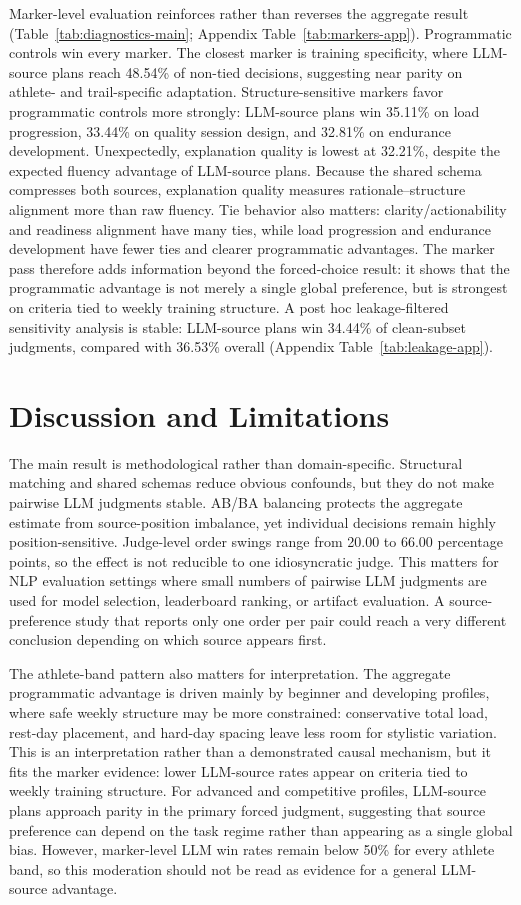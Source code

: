 \documentclass[11pt]{article}
\begin{document}
Marker-level evaluation reinforces rather than reverses the aggregate result (Table~\ref{tab:diagnostics-main}; Appendix Table~\ref{tab:markers-app}). Programmatic controls win every marker. The closest marker is training specificity, where LLM-source plans reach 48.54\% of non-tied decisions, suggesting near parity on athlete- and trail-specific adaptation. Structure-sensitive markers favor programmatic controls more strongly: LLM-source plans win 35.11\% on load progression, 33.44\% on quality session design, and 32.81\% on endurance development. Unexpectedly, explanation quality is lowest at 32.21\%, despite the expected fluency advantage of LLM-source plans. Because the shared schema compresses both sources, explanation quality measures rationale--structure alignment more than raw fluency. Tie behavior also matters: clarity/actionability and readiness alignment have many ties, while load progression and endurance development have fewer ties and clearer programmatic advantages. The marker pass therefore adds information beyond the forced-choice result: it shows that the programmatic advantage is not merely a single global preference, but is strongest on criteria tied to weekly training structure. A post hoc leakage-filtered sensitivity analysis is stable: LLM-source plans win 34.44\% of clean-subset judgments, compared with 36.53\% overall (Appendix Table~\ref{tab:leakage-app}).


\section{Discussion and Limitations}

The main result is methodological rather than domain-specific. Structural matching and shared schemas reduce obvious confounds, but they do not make pairwise LLM judgments stable. AB/BA balancing protects the aggregate estimate from source-position imbalance, yet individual decisions remain highly position-sensitive. Judge-level order swings range from 20.00 to 66.00 percentage points, so the effect is not reducible to one idiosyncratic judge. This matters for NLP evaluation settings where small numbers of pairwise LLM judgments are used for model selection, leaderboard ranking, or artifact evaluation. A source-preference study that reports only one order per pair could reach a very different conclusion depending on which source appears first.

The athlete-band pattern also matters for interpretation. The aggregate programmatic advantage is driven mainly by beginner and developing profiles, where safe weekly structure may be more constrained: conservative total load, rest-day placement, and hard-day spacing leave less room for stylistic variation. This is an interpretation rather than a demonstrated causal mechanism, but it fits the marker evidence: lower LLM-source rates appear on criteria tied to weekly training structure. For advanced and competitive profiles, LLM-source plans approach parity in the primary forced judgment, suggesting that source preference can depend on the task regime rather than appearing as a single global bias. However, marker-level LLM win rates remain below 50\% for every athlete band, so this moderation should not be read as evidence for a general LLM-source advantage.
\end{document}
